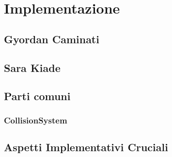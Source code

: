 \chapter{Implementazione}



\section{Gyordan Caminati}
\section{Sara Kiade}
\section{Parti comuni}
\subsection{CollisionSystem}
\section{Aspetti Implementativi Cruciali}